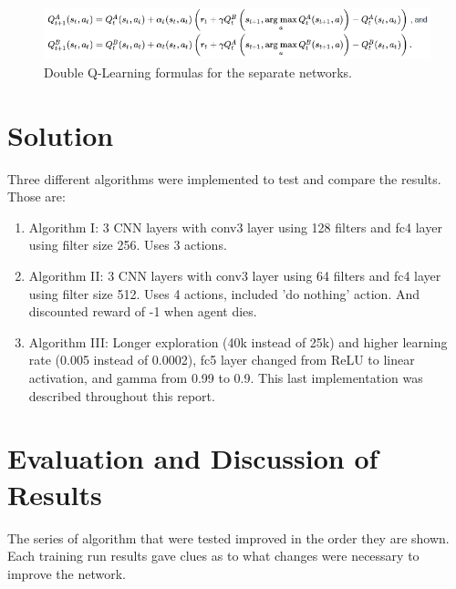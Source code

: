\documentclass{article}
\begin{document}
\begin{figure}[ht]
    \centering
    \includegraphics[width=1\textwidth]{DDQL_function.png}\hfill
    \caption{Double Q-Learning formulas for the separate networks.} 
\end{figure}



\section{Solution}
Three different algorithms were implemented to test and compare the results. Those are:
\begin{enumerate}
    \item Algorithm I: 3 CNN layers with conv3 layer using 128 filters and fc4 layer using filter size 256. Uses 3 actions.
    \item Algorithm II: 3 CNN layers with conv3 layer using 64 filters and fc4 layer using filter size 512. Uses 4 actions, included 'do nothing' action. And discounted reward of -1 when agent dies.
    \item Algorithm III: Longer exploration (40k instead of 25k) and higher learning rate (0.005 instead of 0.0002), fc5 layer changed from ReLU to linear activation, and gamma from 0.99 to 0.9. This last implementation was described throughout this report.
\end{enumerate}


\section{Evaluation and Discussion of Results}
The series of algorithm that were tested improved in the order they are shown. Each training run results gave clues as to what changes were necessary to improve the network. 
\end{document}
